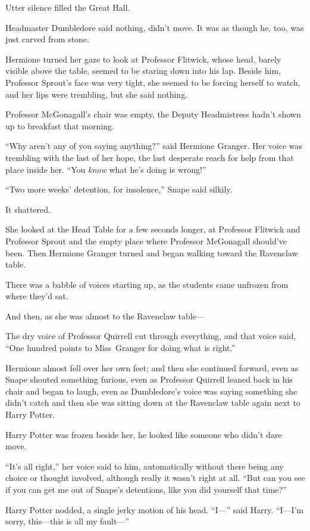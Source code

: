 Utter silence filled the Great Hall.

Headmaster Dumbledore said nothing, didn’t move. It was as though he, too, was just carved from stone.

Hermione turned her gaze to look at Professor Flitwick, whose head, barely visible above the table, seemed to be staring down into his lap. Beside him, Professor Sprout’s face was very tight, she seemed to be forcing herself to watch, and her lips were trembling, but she said nothing.

Professor McGonagall’s chair was empty, the Deputy Headmistress hadn’t shown up to breakfast that morning.

“Why aren’t any of you saying anything?” said Hermione Granger. Her voice was trembling with the last of her hope, the last desperate reach for help from that place inside her. “You \emph{know} what he’s doing is wrong!”

“Two more weeks’ detention, for insolence,” Snape said silkily.

It shattered.

She looked at the Head Table for a few seconds longer, at Professor Flitwick and Professor Sprout and the empty place where Professor McGonagall should’ve been. Then Hermione Granger turned and began walking toward the Ravenclaw table.

There was a babble of voices starting up, as the students came unfrozen from where they’d sat.

And then, as she was almost to the Ravenclaw table—

The dry voice of Professor Quirrell cut through everything, and that voice said, “One hundred points to Miss~Granger for doing what is right.”

Hermione almost fell over her own feet; and then she continued forward, even as Snape shouted something furious, even as Professor Quirrell leaned back in his chair and began to laugh, even as Dumbledore’s voice was saying something she didn’t catch and then she was sitting down at the Ravenclaw table again next to Harry Potter.

Harry Potter was frozen beside her, he looked like someone who didn’t dare move.

“It’s all right,” her voice said to him, automatically without there being any choice or thought involved, although really it wasn’t right at all. “But can you see if you can get me out of Snape’s detentions, like you did yourself that time?”

Harry Potter nodded, a single jerky motion of his head. “I—” said Harry. “I—I’m sorry, this—this is all my fault—”

